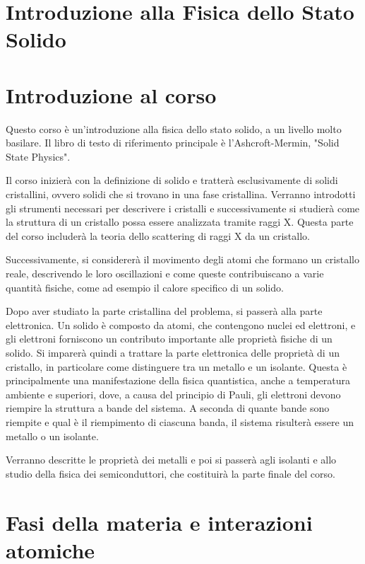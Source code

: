 
\section{Introduzione alla Fisica dello Stato Solido}
\label{appendix:lesson01}

\section*{Introduzione al corso}

Questo corso è un'introduzione alla fisica dello stato solido, a un livello molto basilare. Il libro di testo di riferimento principale è l'Ashcroft-Mermin, "Solid State Physics".

Il corso inizierà con la definizione di solido e tratterà esclusivamente di solidi cristallini, ovvero solidi che si trovano in una fase cristallina. Verranno introdotti gli strumenti necessari per descrivere i cristalli e successivamente si studierà come la struttura di un cristallo possa essere analizzata tramite raggi X. Questa parte del corso includerà la teoria dello scattering di raggi X da un cristallo.

Successivamente, si considererà il movimento degli atomi che formano un cristallo reale, descrivendo le loro oscillazioni e come queste contribuiscano a varie quantità fisiche, come ad esempio il calore specifico di un solido.

Dopo aver studiato la parte cristallina del problema, si passerà alla parte elettronica. Un solido è composto da atomi, che contengono nuclei ed elettroni, e gli elettroni forniscono un contributo importante alle proprietà fisiche di un solido. Si imparerà quindi a trattare la parte elettronica delle proprietà di un cristallo, in particolare come distinguere tra un metallo e un isolante. Questa è principalmente una manifestazione della fisica quantistica, anche a temperatura ambiente e superiori, dove, a causa del principio di Pauli, gli elettroni devono riempire la struttura a bande del sistema. A seconda di quante bande sono riempite e qual è il riempimento di ciascuna banda, il sistema risulterà essere un metallo o un isolante.

Verranno descritte le proprietà dei metalli e poi si passerà agli isolanti e allo studio della fisica dei semiconduttori, che costituirà la parte finale del corso.

\section*{Fasi della materia e interazioni atomiche}

